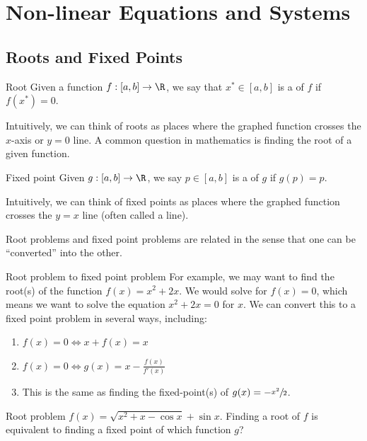 \chapter{Non-linear Equations and Systems}

\section{Roots and Fixed Points}

\begin{dfnbox}{Root}{}
    Given a function $f : [a,b] \to \R$, we say that $x^* \in [a,b]$ is a  of $f$ if $f(x^*) = 0$.
\end{dfnbox}

Intuitively, we can think of roots as places where the graphed function crosses the $x$-axis or $y = 0$ line. A common question in mathematics is finding the root of a given function.


\begin{dfnbox}{Fixed point}{}
    Given $g : [a,b] \to \R$, we say $p \in [a,b]$ is a  of $g$ if $g(p) = p$.
\end{dfnbox}

Intuitively, we can think of fixed points as places where the graphed function crosses the $y=x$ line (often called a  line).

Root problems and fixed point problems are related in the sense that one can be ``converted'' into the other.

\begin{exbox}{Root problem to fixed point problem}{}
    For example, we may want to find the root(s) of the function $f(x) = x^2 + 2x$. We would solve for $f(x) = 0$, which means we want to solve the equation $x^2 + 2x = 0$ for $x$. We can convert this to a fixed point problem in several ways, including:
    \begin{enumerate}
        \item $f(x) = 0 \iff x + f(x) = x$ 
        \item $f(x) = 0 \iff g(x) = x - \frac{f(x)}{f\prime(x)}$
        \item This is the same as finding the fixed-point(s) of $g(x) = -\sfrac{x^2}{2}$.
    \end{enumerate}
\end{exbox}

\begin{exbox}{Root problem}{}
    $f(x) = \sqrt{x^2 + x - \cos x} + \sin x$.
    \tcblower
    Finding a root of $f$ is equivalent to finding a fixed point of which function $g$?
\end{exbox}

